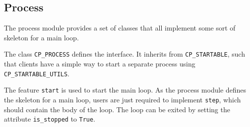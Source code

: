 \documentclass[a4paper,10pt]{article}
\begin{document}
% 
% 
%   
%     
%   
% 
%     
% 
% 
% 
% 
% 


\subsection{Process}

The process module provides a set of classes that all implement some sort of skeleton for a main loop.

The class \lstinline!CP_PROCESS! defines the interface.
It inherits from \lstinline!CP_STARTABLE!, such that clients have a simple way to start a separate process using \lstinline!CP_STARTABLE_UTILS!.

The feature \lstinline!start! is used to start the main loop.
As the process module defines the skeleton for a main loop, users are just required to implement \lstinline!step!, which should contain the body of the loop.
The loop can be exited by setting the attribute \lstinline!is_stopped! to \lstinline!True!.
\end{document}
